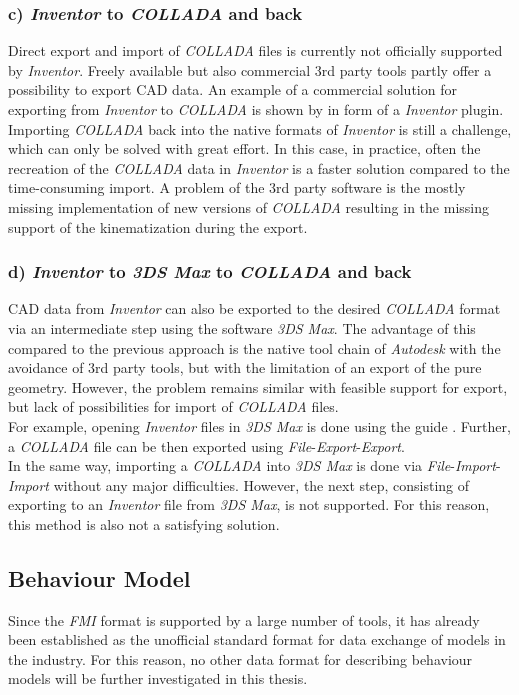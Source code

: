 \subsubsection{c) \textit{Inventor} to \textit{COLLADA} and back}
    Direct export and import of \textit{COLLADA} files is currently not officially supported by \textit{Inventor}. Freely available but also commercial 3rd party tools partly offer a possibility to export CAD data. An example of a commercial solution for exporting from \textit{Inventor} to \textit{COLLADA} is shown by \cite{ColladaExportPlugin} in form of a \textit{Inventor} plugin. Importing \textit{COLLADA} back into the native formats of \textit{Inventor} is still a challenge, which can only be solved with great effort. In this case, in practice, often the recreation of the \textit{COLLADA} data in \textit{Inventor} is a faster solution compared to the time-consuming import. A problem of the 3rd party software is the mostly missing implementation of new versions of \textit{COLLADA} resulting in the missing support of the kinematization during the export.  
    
\subsubsection{d) \textit{Inventor} to \textit{3DS Max} to \textit{COLLADA} and back}
    CAD data from \textit{Inventor} can also be exported to the desired \textit{COLLADA} format via an intermediate step using the software \textit{3DS Max}. The advantage of this compared to the previous approach is the native tool chain of \textit{Autodesk} with the avoidance of 3rd party tools, but with the limitation of an export of the pure geometry. However, the problem remains similar with feasible support for export, but lack of possibilities for import of \textit{COLLADA} files. \\
    For example, opening \textit{Inventor} files in \textit{3DS Max} is done using the guide \cite{DsMaxAnleitungImportInventor}. Further, a \textit{COLLADA} file can be then exported using \textit{File}-\textit{Export}-\textit{Export}. \\ 
    In the same way, importing a \textit{COLLADA} into \textit{3DS Max} is done via \textit{File}-\textit{Import}-\textit{Import} without any major difficulties. However, the next step, consisting of exporting to an \textit{Inventor} file from \textit{3DS Max}, is not supported. For this reason, this method is also not a satisfying solution.
    
\subsection{Behaviour Model}    \label{sec:MethodsModel}
    Since the \textit{FMI} format is supported by a large number of tools, it has already been established as the unofficial standard format for data exchange of models in the industry. For this reason, no other data format for describing behaviour models will be further investigated in this thesis. \\
    
